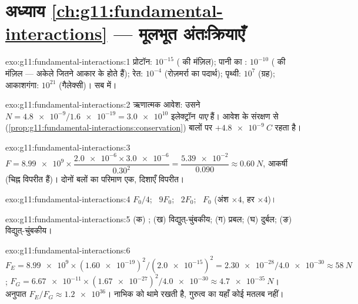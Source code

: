 \section*{अध्याय \ref{ch:g11:fundamental-interactions} --- मूलभूत अंतःक्रियाएँ}

\begin{solution}{exo:g11:fundamental-interactions:1}
प्रोटॉन: $10^{-15}$ ( की मंज़िल); पानी का : $10^{-10}$
( की मंज़िल --- अकेले   जितने आकार के होते हैं);
रेत: $10^{-4}$ (रोज़मर्रा का पदार्थ); पृथ्वी: $10^{7}$ (ग्रह); आकाशगंगा: $10^{21}$
(गैलेक्सी)। सब  में।
\end{solution}

\begin{solution}{exo:g11:fundamental-interactions:2}
ऋणात्मक आवेश: उसने $N = \num{4.8e-9}/\num{1.6e-19} = \num{3.0e10}$ इलेक्ट्रॉन \emph{पाए} हैं। आवेश के संरक्षण से
(\cref{prop:g11:fundamental-interactions:conservation}) बालों पर $+\qty{4.8e-9}{C}$ रहता है।
\end{solution}

\begin{solution}{exo:g11:fundamental-interactions:3}
$F = \num{8.99e9} \times \dfrac{\num{2.0e-6} \times \num{3.0e-6}}{0.30^2}
= \dfrac{\num{5.39e-2}}{0.090} \approx \qty{0.60}{N}$, आकर्षी (चिह्न विपरीत हैं)। दोनों बलों का परिमाण एक, दिशाएँ
विपरीत।
\end{solution}

\begin{solution}{exo:g11:fundamental-interactions:4}
$F_0/4$; \ $9F_0$; \ $2F_0$; \ $F_0$ (अंश $\times 4$, हर $\times 4$)।
\end{solution}

\begin{solution}{exo:g11:fundamental-interactions:5}
(क) ; (ख) विद्युत्-चुंबकीय; (ग) प्रबल; (घ) दुर्बल;
(ङ) विद्युत्-चुंबकीय।
\end{solution}

\begin{solution}{exo:g11:fundamental-interactions:6}
$F_E = \num{8.99e9} \times (\num{1.60e-19})^2/(\num{2.0e-15})^2
= \num{2.30e-28}/\num{4.0e-30} \approx \qty{58}{N}$; $F_G = \num{6.67e-11} \times (\num{1.67e-27})^2/\num{4.0e-30}
\approx \qty{4.7e-35}{N}$। अनुपात $F_E/F_G \approx \num{1.2e36}$। नाभिक को 
थामे रखती है, गुरुत्व का यहाँ कोई मतलब नहीं।
\end{solution}

